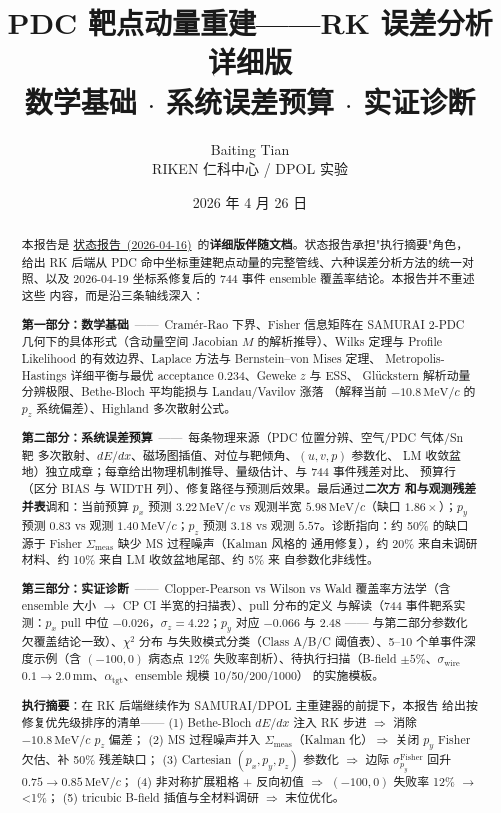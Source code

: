 \documentclass[a4paper, 11pt]{article}
\title{\textbf{PDC 靶点动量重建——RK 误差分析详细版\\
       \large 数学基础 \(\cdot\) 系统误差预算 \(\cdot\) 实证诊断}}
\author{Baiting Tian \\ RIKEN 仁科中心 / DPOL 实验}
\date{2026 年 4 月 26 日}
\theoremstyle{plain}
\theoremstyle{definition}
\theoremstyle{remark}
\providecommand{\StatusReport}{\href{rk_reconstruction_status_20260416_zh.pdf}{状态报告~(2026-04-16)}}
\begin{document}
\maketitle

\begin{abstract}
\noindent
本报告是
\StatusReport\
的\textbf{详细版伴随文档}。状态报告承担"执行摘要"角色，给出 RK 后端从
PDC 命中坐标重建靶点动量的完整管线、六种误差分析方法的统一对照、以及
2026-04-19 坐标系修复后的 744 事件 ensemble 覆盖率结论。本报告并不重述这些
内容，而是沿三条轴线深入：

\textbf{第一部分：数学基础}~——~Cramér-Rao 下界、Fisher 信息矩阵在 SAMURAI
2-PDC 几何下的具体形式（含动量空间 Jacobian $M$ 的解析推导）、Wilks 定理与
Profile Likelihood 的有效边界、Laplace 方法与 Bernstein–von Mises 定理、
Metropolis-Hastings 详细平衡与最优 acceptance 0.234、Geweke $z$ 与 ESS、
Glückstern 解析动量分辨极限、Bethe-Bloch 平均能损与 Landau/Vavilov 涨落
（解释当前 $-10.8\,\mathrm{MeV}/c$ 的 $p_z$ 系统偏差）、Highland 多次散射公式。

\textbf{第二部分：系统误差预算}~——~每条物理来源（PDC 位置分辨、空气/PDC
气体/Sn 靶 多次散射、$dE/dx$、磁场图插值、对位与靶倾角、$(u,v,p)$ 参数化、
LM 收敛盆地）独立成章；每章给出物理机制推导、量级估计、与 744 事件残差对比、
预算行（区分 BIAS 与 WIDTH 列）、修复路径与预测后效果。最后通过\textbf{二次方
和与观测残差并表}调和：当前预算 $p_x$ 预测 $3.22\,\mathrm{MeV}/c$ vs
观测半宽 $5.98\,\mathrm{MeV}/c$（缺口 $1.86\times$）；$p_y$ 预测 $0.83$ vs
观测 $1.40\,\mathrm{MeV}/c$；$p_z$ 预测 $3.18$ vs 观测 $5.57$。诊断指向：约
50\% 的缺口源于 Fisher $\Sigma_\mathrm{meas}$ 缺少 MS 过程噪声（Kalman 风格的
通用修复），约 20\% 来自未调研材料、约 10\% 来自 LM 收敛盆地尾部、约 5\% 来
自参数化非线性。

\textbf{第三部分：实证诊断}~——~Clopper-Pearson vs Wilson vs Wald
覆盖率方法学（含 ensemble 大小 $\to$ CP CI 半宽的扫描表）、pull 分布的定义
与解读（744 事件靶系实测：$p_x$ pull 中位 $-0.026$，$\sigma_z = 4.22$；$p_y$
对应 $-0.066$ 与 $2.48$ —— 与第二部分参数化欠覆盖结论一致）、$\chi^2$ 分布
与失败模式分类（Class A/B/C 阈值表）、5--10 个单事件深度示例（含 $(-100, 0)$
病态点 12\% 失败率剖析）、待执行扫描（B-field $\pm5\%$、$\sigma_\mathrm{wire}$
$0.1\to 2.0\,\mathrm{mm}$、$\alpha_\mathrm{tgt}$、ensemble 规模 10/50/200/1000）
的实施模板。

\textbf{执行摘要}：在 RK 后端继续作为 SAMURAI/DPOL 主重建器的前提下，本报告
给出按修复优先级排序的清单——
(1) Bethe-Bloch $dE/dx$ 注入 RK 步进 \(\Rightarrow\) 消除 $-10.8\,\mathrm{MeV}/c$
$p_z$ 偏差；
(2) MS 过程噪声并入 $\Sigma_\mathrm{meas}$（Kalman 化）\(\Rightarrow\) 关闭 $p_y$
Fisher 欠估、补 50\% 残差缺口；
(3) Cartesian $(p_x,p_y,p_z)$ 参数化 \(\Rightarrow\) 边际 $\sigma_{p_y}^\mathrm{Fisher}$
回升 $0.75 \to 0.85\,\mathrm{MeV}/c$；
(4) 非对称扩展粗格 + 反向初值 \(\Rightarrow\) $(-100,0)$ 失败率 12\% \(\to\) <1\%；
(5) tricubic B-field 插值与全材料调研 \(\Rightarrow\) 末位优化。
\end{abstract}
\end{document}
